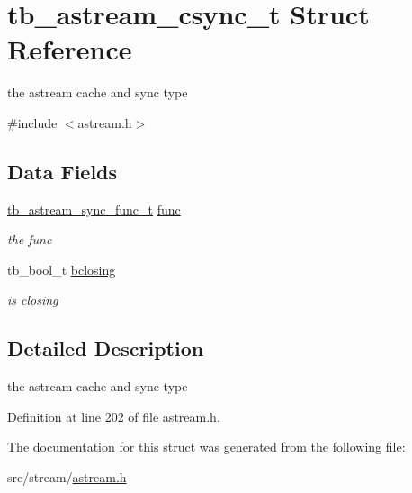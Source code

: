 \hypertarget{structtb__astream__csync__t}{\section{tb\-\_\-astream\-\_\-csync\-\_\-t Struct Reference}
\label{structtb__astream__csync__t}
}


the astream cache and sync type  




{\ttfamily \#include $<$astream.\-h$>$}

\subsection*{Data Fields}
\begin{DoxyCompactItemize}
\item 
\hypertarget{structtb__astream__csync__t_ab53e86dabc265e6e05f0cdd4859ace15}{\hyperlink{astream_8h_a972a0ad008bf72f7219dce843f194e86}{tb\-\_\-astream\-\_\-sync\-\_\-func\-\_\-t} \hyperlink{structtb__astream__csync__t_ab53e86dabc265e6e05f0cdd4859ace15}{func}}\label{structtb__astream__csync__t_ab53e86dabc265e6e05f0cdd4859ace15}

\begin{DoxyCompactList}\small\item\em the func \end{DoxyCompactList}\item 
\hypertarget{structtb__astream__csync__t_a01fc41532a945e92798c1b59d373a2cf}{tb\-\_\-bool\-\_\-t \hyperlink{structtb__astream__csync__t_a01fc41532a945e92798c1b59d373a2cf}{bclosing}}\label{structtb__astream__csync__t_a01fc41532a945e92798c1b59d373a2cf}

\begin{DoxyCompactList}\small\item\em is closing \end{DoxyCompactList}\end{DoxyCompactItemize}


\subsection{Detailed Description}
the astream cache and sync type 

Definition at line 202 of file astream.\-h.



The documentation for this struct was generated from the following file\-:\begin{DoxyCompactItemize}
\item 
src/stream/\hyperlink{astream_8h}{astream.\-h}\end{DoxyCompactItemize}
